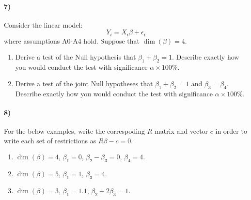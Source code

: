 \documentclass[12pt]{article}
\newcommand\eps{\epsilon}
\numberwithin{equation}{section}
\numberwithin{figure}{section}
\numberwithin{table}{section}
\begin{document}
\paragraph{7)} Consider the linear model:
\[Y_i = X_i\beta + \eps_i\]
where assumptions A0-A4 hold. Suppose that $\dim(\beta)=4$.
\begin{enumerate}
\item Derive a test of the Null hypothesis that $\beta_1+\beta_2=1$. Describe exactly how you would conduct the test with significance $\alpha\times100\%$.
\item Derive a test of the joint Null hypotheses that $\beta_1+\beta_2=1$ and $\beta_3=\beta_4$. Describe exactly how you would conduct the test with significance $\alpha\times100\%$.
\end{enumerate}

\paragraph{8)} For the below examples, write the correspoding $R$ matrix and vector $c$ in order to write each set of restrictions as $R\beta-c=0$.
\begin{enumerate}
\item $\dim(\beta)=4$, $\beta_1=0$, $\beta_2-\beta_3=0$, $\beta_4=4$. \\
\item $\dim(\beta)=5$, $\beta_1=1$, $\beta_3 = 4$.
\item $\dim(\beta) = 3$, $\beta_1 = 1.1$, $\beta_2 + 2\beta_3 = 1$.
\end{enumerate}
\end{document}
